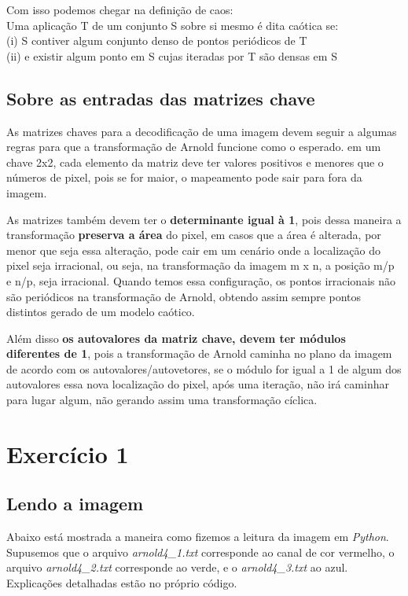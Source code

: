 \documentclass[a4paper, 12pt]{article}
\begin{document}
Com isso podemos chegar na definição de caos:\\

Uma aplicação T de um conjunto S sobre si mesmo é dita caótica se:\\

(i) S contiver algum conjunto denso de pontos periódicos de T\\

(ii) e existir algum ponto em S cujas iteradas por T são densas em S




\subsection{Sobre as entradas das matrizes chave}
 
As matrizes chaves para a decodificação de uma imagem devem seguir a algumas regras para que a transformação de Arnold funcione como o esperado. em um chave 2x2, cada elemento da matriz deve ter valores positivos e menores que o números de pixel, pois se for maior, o mapeamento pode sair para fora da imagem.

As matrizes também devem ter o \textbf{determinante igual à 1}, pois dessa maneira a transformação \textbf{preserva a área} \citep{9321487} do pixel, em casos que a área é alterada, por menor que seja essa alteração, pode cair em um cenário onde a localização do pixel seja irracional, ou seja, na transformação da imagem m x n, a posição m/p e n/p, seja irracional. Quando temos essa configuração, os pontos irracionais não são periódicos na transformação de Arnold, obtendo assim sempre pontos distintos gerado de um modelo caótico.

Além disso \textbf{os autovalores da matriz chave, devem ter módulos diferentes de 1}, pois a transformação de Arnold caminha no plano da imagem de acordo com os autovalores/autovetores, se o módulo for igual a 1 de algum dos autovalores essa nova localização do pixel, após uma iteração, não irá caminhar para lugar algum, não gerando assim uma transformação cíclica.

\section{Exercício 1}
\subsection{Lendo a imagem}

Abaixo está mostrada a maneira como fizemos a leitura da imagem em \textit{Python}. Supusemos que o arquivo \textit{arnold4\_1.txt} corresponde ao canal de cor vermelho, o arquivo \textit{arnold4\_2.txt} corresponde ao verde, e o \textit{arnold4\_3.txt} ao azul. Explicações detalhadas estão no próprio código.\\
\end{document}
